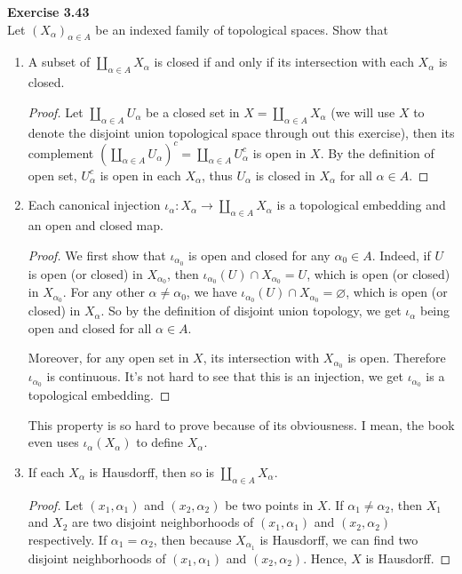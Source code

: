 \documentclass[12pt, a4paper]{article}
\theoremstyle{plain}
\newenvironment{exercise}[2][Exercise]
    { \begin{mdframed}[backgroundcolor=gray!20] \textbf{#1 #2} \\}
    {  \end{mdframed}}
\begin{document}
\begin{exercise}{3.43}
Let $(X_\alpha)_{\alpha\in A}$ be an indexed family of topological spaces. Show that
\begin{enumerate}[label=(\alph*)]
\item A subset of $\coprod_{\alpha\in A}X_\alpha$ is closed if and only if its intersection with each $X_\alpha$ is closed.
	\begin{proof}
	Let $\coprod_{\alpha\in A}U_\alpha$ be a closed set in $X=\coprod_{\alpha\in A}X_\alpha$ (we will use $X$ to denote the disjoint union topological space through out this exercise), then its complement $(\coprod_{\alpha\in A}U_\alpha)^c=\coprod_{\alpha\in A}U_\alpha^c$ is open in $X$. By the definition of open set, $U_\alpha^c$ is open in each $X_\alpha$, thus $U_\alpha$ is closed in $X_\alpha$ for all $\alpha\in A$. 
	\end{proof}

\item Each canonical injection $\iota_\alpha:X_\alpha\rightarrow \coprod_{\alpha\in A}X_\alpha$ is a topological embedding and an open and closed map.
	\begin{proof}
	We first show that $\iota_{\alpha_0}$ is open and closed for any $\alpha_0\in A$. Indeed, if $U$ is open (or closed) in $X_{\alpha_0}$, then $\iota_{\alpha_0}(U)\cap X_{\alpha_0} = U$, which is open (or closed) in $X_{\alpha_0}$. For any other $\alpha\neq \alpha_0$, we have $\iota_{\alpha_0}(U)\cap X_{\alpha_0} = \varnothing$, which is open (or closed) in $X_\alpha$. So by the definition of disjoint union topology, we get $\iota_\alpha$ being open and closed for all $\alpha\in A$.
	
	Moreover, for any open set in $X$, its intersection with $X_{\alpha_0}$ is open. Therefore $\iota_{\alpha_0}$ is continuous. It's not hard to see that this is an injection, we get $\iota_{\alpha_0}$ is a topological embedding. 
	\end{proof}
	This property is so hard to prove because of its obviousness. I mean, the book even uses $\iota_\alpha(X_\alpha)$ to define $X_\alpha$.

\item If each $X_\alpha$ is Hausdorff, then so is $\coprod_{\alpha\in A}X_\alpha$.
	\begin{proof}
	Let $(x_1,\alpha_1)$ and $(x_2,\alpha_2)$ be two points in $X$. If $\alpha_1\neq \alpha_2$, then $X_1$ and $X_2$ are two disjoint neighborhoods of $(x_1,\alpha_1)$ and $(x_2,\alpha_2)$ respectively. If $\alpha_1=\alpha_2$, then because $X_{\alpha_1}$ is Hausdorff, we can find two disjoint neighborhoods of $(x_1,\alpha_1)$ and $(x_2,\alpha_2)$. Hence, $X$ is Hausdorff.
	\end{proof}


\end{enumerate}
\end{exercise}
\end{document}
